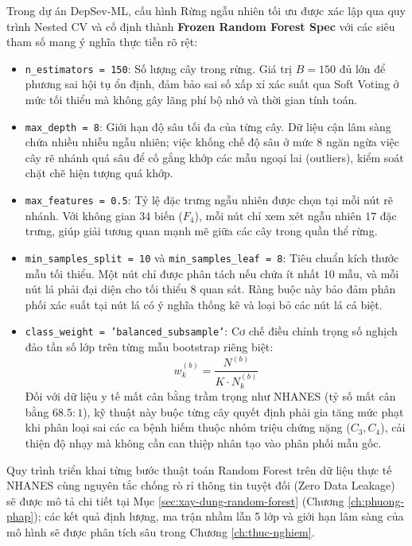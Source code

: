 Trong dự án DepSev-ML, cấu hình Rừng ngẫu nhiên tối ưu được xác lập qua quy trình Nested CV và cố định thành \textbf{Frozen Random Forest Spec} với các siêu tham số mang ý nghĩa thực tiễn rõ rệt:
\begin{itemize}
    \item \texttt{n\_estimators = 150}: Số lượng cây trong rừng. Giá trị $B = 150$ đủ lớn để phương sai hội tụ ổn định, đảm bảo sai số xấp xỉ xác suất qua Soft Voting ở mức tối thiểu mà không gây lãng phí bộ nhớ và thời gian tính toán.
    \item \texttt{max\_depth = 8}: Giới hạn độ sâu tối đa của từng cây. Dữ liệu cận lâm sàng chứa nhiều nhiễu ngẫu nhiên; việc khống chế độ sâu ở mức 8 ngăn ngừa việc cây rẽ nhánh quá sâu để cố gắng khớp các mẫu ngoại lai (outliers), kiểm soát chặt chẽ hiện tượng quá khớp.
    \item \texttt{max\_features = 0.5}: Tỷ lệ đặc trưng ngẫu nhiên được chọn tại mỗi nút rẽ nhánh. Với không gian 34 biến ($F_4$), mỗi nút chỉ xem xét ngẫu nhiên $17$ đặc trưng, giúp giải tương quan mạnh mẽ giữa các cây trong quần thể rừng.
    \item \texttt{min\_samples\_split = 10} và \texttt{min\_samples\_leaf = 8}: Tiêu chuẩn kích thước mẫu tối thiểu. Một nút chỉ được phân tách nếu chứa ít nhất 10 mẫu, và mỗi nút lá phải đại diện cho tối thiểu 8 quan sát. Ràng buộc này bảo đảm phân phối xác suất tại nút lá có ý nghĩa thống kê và loại bỏ các nút lá cá biệt.
    \item \texttt{class\_weight = 'balanced\_subsample'}: Cơ chế điều chỉnh trọng số nghịch đảo tần số lớp trên từng mẫu bootstrap riêng biệt:
    \begin{equation}
        w_k^{(b)} = \frac{N^{(b)}}{K \cdot N_k^{(b)}}
    \end{equation}
    Đối với dữ liệu y tế mất cân bằng trầm trọng như NHANES (tỷ số mất cân bằng $68.5:1$), kỹ thuật này buộc từng cây quyết định phải gia tăng mức phạt khi phân loại sai các ca bệnh hiếm thuộc nhóm triệu chứng nặng ($C_3, C_4$), cải thiện độ nhạy mà không cần can thiệp nhân tạo vào phân phối mẫu gốc.
\end{itemize}

Quy trình triển khai từng bước thuật toán Random Forest trên dữ liệu thực tế NHANES cùng nguyên tắc chống rò rỉ thông tin tuyệt đối (Zero Data Leakage) sẽ được mô tả chi tiết tại Mục \ref{sec:xay-dung-random-forest} (Chương \ref{ch:phuong-phap}); các kết quả định lượng, ma trận nhầm lẫn 5 lớp và giới hạn lâm sàng của mô hình sẽ được phân tích sâu trong Chương \ref{ch:thuc-nghiem}.

